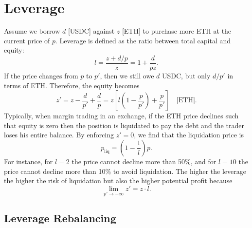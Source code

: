 \documentclass[journal,letterpaper,oneside,onecolumn,12pt]{IEEEtran}
\begin{document}
	
	
	\newpage
	\appendices
	
	\section{Leverage} \label{app:margin_trading}
	

	Assume we borrow $d$ [USDC] against $z$ [ETH] to purchase more ETH at the current price of $p$. Leverage is defined as the ratio between total capital and equity:
	\begin{equation}
		l = \frac{z+d/p	}{z} = 1+\frac{d}{pz}.
	\end{equation}
	If the price changes from $p$ to $p'$, then we still owe $d$ USDC, but only $d/p'$ in terms of ETH. Therefore, the equity becomes
	\begin{equation} \label{eq:equity}
		z' = z -\frac{d}{p'} +\frac{d}{p} = z\left[l\left(1-\frac{p}{p'}\right)+\frac{p}{p'}\right] \quad\text{[ETH]}.
	\end{equation}
	Typically, when margin trading in an exchange, if the ETH price declines such that equity is zero then the position is liquidated to pay the debt and the trader loses his entire balance. By enforcing $z'=0$, we find that the liquidation price is
	\begin{equation}
		p_\text{liq} =\left(1-\frac{1}{l}\right)p. 
	\end{equation}
	For instance, for $l=2$ the price cannot decline more than 50\%, and for $l=10$ the price cannot decline more than 10\% to avoid liquidation. The higher the leverage the higher the risk of liquidation but also the higher potential profit because
	\begin{equation} \label{eq:asymptotic_lev}
		\lim\limits_{p'\rightarrow+\infty} z' = z\cdot l.
	\end{equation}


	\subsection{Leverage Rebalancing} \label{app:leverage:rebalancing}
	
\end{document}
